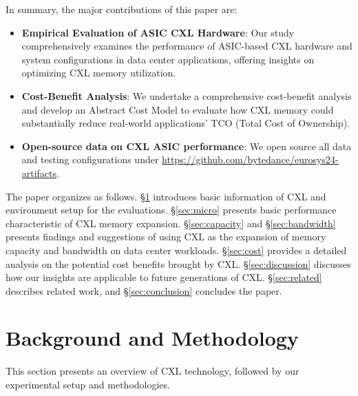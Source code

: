 In summary, the major contributions of this paper are:
\begin{itemize}
\item \textbf{Empirical Evaluation of ASIC CXL Hardware}:
Our study comprehensively examines the performance of ASIC-based CXL hardware and system configurations in data center applications, offering insights on optimizing CXL memory utilization.

\item \textbf{Cost-Benefit Analysis}: We undertake a comprehensive cost-benefit analysis and develop an Abstract Cost Model to evaluate how CXL memory could substantially reduce real-world applications' TCO (Total Cost of Ownership).

\item \textbf{Open-source data on CXL ASIC performance}: We open source all data and testing configurations under \url{https://github.com/bytedance/eurosys24-artifacts}.


\end{itemize}

The paper organizes as follows. \S\ref{sec:background} introduces basic information of CXL and 
environment setup for the evaluations. \S\ref{sec:micro} presents basic performance characteristic of CXL memory expansion. \S\ref{sec:capacity} and \S\ref{sec:bandwidth} presents findings and suggestions of using CXL as the expansion of memory capacity and bandwidth on data center workloads. \S\ref{sec:cost}  provides a detailed analysis on the potential cost benefits brought by CXL. \S\ref{sec:discussion} discusses how our insights are applicable to future generations of CXL. \S\ref{sec:related} describes related work, and \S\ref{sec:conclusion} concludes the paper.















\section{Background and Methodology}
\label{sec:background}

This section presents an overview of CXL technology, followed by our experimental setup and methodologies.

